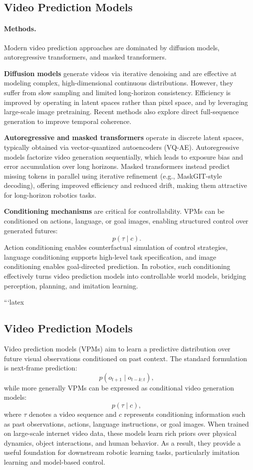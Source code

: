 \subsection{Video Prediction Models}


\paragraph{Methods.}
Modern video prediction approaches are dominated by diffusion models, autoregressive transformers, and masked transformers.

\textbf{Diffusion models} generate videos via iterative denoising and are effective at modeling complex, high-dimensional continuous distributions. However, they suffer from slow sampling and limited long-horizon consistency. Efficiency is improved by operating in latent spaces rather than pixel space, and by leveraging large-scale image pretraining. Recent methods also explore direct full-sequence generation to improve temporal coherence.


\textbf{Autoregressive and masked transformers} operate in discrete latent spaces, typically obtained via vector-quantized autoencoders (VQ-AE). Autoregressive models factorize video generation sequentially, which leads to exposure bias and error accumulation over long horizons. Masked transformers instead predict missing tokens in parallel using iterative refinement (e.g., MaskGIT-style decoding), offering improved efficiency and reduced drift, making them attractive for long-horizon robotics tasks.

\textbf{Conditioning mechanisms} are critical for controllability. VPMs can be conditioned on actions, language, or goal images, enabling structured control over generated futures:
\[
p(\tau \mid c).
\]
Action conditioning enables counterfactual simulation of control strategies, language conditioning supports high-level task specification, and image conditioning enables goal-directed prediction. In robotics, such conditioning effectively turns video prediction models into controllable world models, bridging perception, planning, and imitation learning.







```latex
\subsection{Video Prediction Models}

Video prediction models (VPMs) aim to learn a predictive distribution over future visual observations conditioned on past context. The standard formulation is next-frame prediction:
\[
p(o_{t+1} \mid o_{t-k:t}),
\]
while more generally VPMs can be expressed as conditional video generation models:
\[
p(\tau \mid c),
\]
where $\tau$ denotes a video sequence and $c$ represents conditioning information such as past observations, actions, language instructions, or goal images. When trained on large-scale internet video data, these models learn rich priors over physical dynamics, object interactions, and human behavior. As a result, they provide a useful foundation for downstream robotic learning tasks, particularly imitation learning and model-based control.

